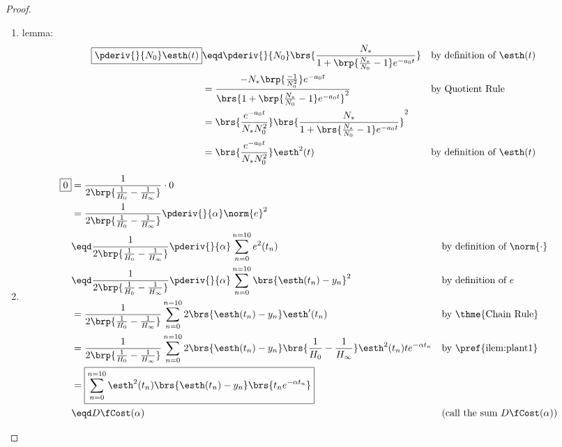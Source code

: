 \begin{proof}
\begin{enumerate}
  \item lemma:\label{ilem:plant3}
  \begin{align*}
      \boxed{\pderiv{}{N_0}\esth(t)}
        &\eqd \pderiv{}{N_0 }\brs{\frac{N_*}{1+\brp{\frac{N_*}{N_0}-1}e^{-a_0 t}}}
        && \text{by definition of $\esth(t)$}
      \\&= \frac{ - N_*\brp{\frac{-1}{N_0^2}}e^{-a_0 t}}
                {\brs{1+\brp{\frac{N_*}{N_0}-1}e^{-a_0 t}}^2}
        && \text{by Quotient Rule}
      \\&= \brs{ \frac{e^{-a_0 t}}{N_*N_0^2}}
           \brs{\frac{N_*}{1+\brs{\frac{N_*}{N_0}-1}e^{-a_0 t}}}^2
      \\&= \brs{ \frac{e^{-a_0 t}}{N_*N_0^2}}
           \esth^2(t)
        && \text{by definition of $\esth(t)$}
    \end{align*}

  \item 
    \begin{align*}
    \boxed{0}
      &= \frac{1}{2\brp{\frac{1}{H_0}-\frac{1}{H_{\infty}}}}\cdot0
    \\&=\frac{1}{2\brp{\frac{1}{H_0}-\frac{1}{H_{\infty}}}}\pderiv{}{\alpha }\norm{e}^2
    \\&\eqd \frac{1}{2\brp{\frac{1}{H_0}-\frac{1}{H_{\infty}}}}\pderiv{}{\alpha }\sum_{n=0}^{n=10}e^2(t_n)
      && \text{by definition of $\norm{\cdot}$}
    \\&\eqd \frac{1}{2\brp{\frac{1}{H_0}-\frac{1}{H_{\infty}}}}\pderiv{}{\alpha }\sum_{n=0}^{n=10}\brs{\esth(t_n)-y_n}^2
      && \text{by definition of $e$}
    \\&= \frac{1}{2\brp{\frac{1}{H_0}-\frac{1}{H_{\infty}}}}\sum_{n=0}^{n=10}2\brs{\esth(t_n)-y_n}\esth'(t_n)
      && \text{by \thme{Chain Rule}}
    \\&= \frac{1}{2\brp{\frac{1}{H_0}-\frac{1}{H_{\infty}}}}\sum_{n=0}^{n=10}2\brs{\esth(t_n)-y_n}\brs{\frac{1}{H_0}-\frac{1}{H_{\infty}}}\esth^2(t_n)te^{-\alpha t_n}
      && \text{by \pref{ilem:plant1}}
    \\&= \boxed{\sum_{n=0}^{n=10}\esth^2(t_n)\brs{\esth(t_n)-y_n} \brs{t_ne^{-\alpha t_n}}}
    \\&\eqd D\fCost(\alpha ) 
      && \text{(call the sum $D\fCost(\alpha )$)}
    \end{align*}


\end{enumerate}
\end{proof}
